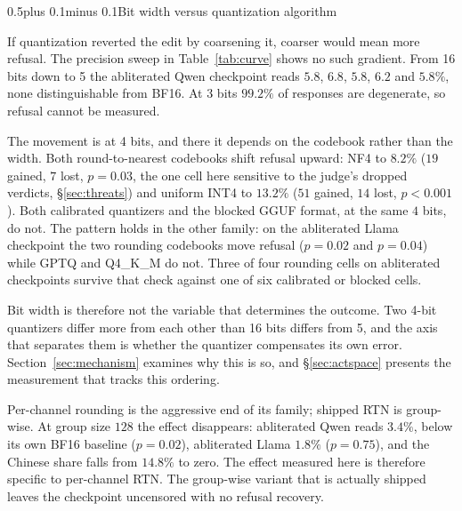 \documentclass[conference,compsoc,letterpaper]{IEEEtran}
\makeatletter
\def\subsection{\@startsection{subsection}{2}{\z@}{1\baselineskip plus 0.25\baselineskip minus 0.25\baselineskip}%
{0.5\baselineskip plus 0.1\baselineskip minus 0.1\baselineskip}{\normalfont\sublargesize\bfseries}}%
\makeatother
\begin{document}
\subsection{Bit width versus quantization algorithm} \label{sec:bits}

\begin{table}[t]
\caption{Abliterated Qwen2.5-7B across round-to-nearest precisions and NF4,
$n=500$, LLM judge. $p$ is an exact McNemar test against BF16.}
\label{tab:curve}
\centering\scriptsize

\end{table}

If quantization reverted the edit by coarsening it, coarser would mean more refusal. The precision sweep in Table~\ref{tab:curve} shows no such gradient. From 16 bits down to 5 the abliterated Qwen checkpoint reads $5.8$, $6.8$, $5.8$, $6.2$ and $5.8\%$, none distinguishable from BF16. At 3 bits $99.2\%$ of responses are degenerate, so refusal cannot be measured.

The movement is at 4 bits, and there it depends on the codebook rather than the width. Both round-to-nearest codebooks shift refusal upward: NF4 to $8.2\%$ ($19$ gained, $7$ lost, $p=0.03$, the one cell here sensitive to the judge's dropped verdicts, \S\ref{sec:threats}) and uniform INT4 to $13.2\%$ ($51$ gained, $14$ lost, $p<0.001$). Both calibrated quantizers and the blocked GGUF format, at the same $4$ bits, do not. The pattern holds in the other family: on the abliterated Llama checkpoint the two rounding codebooks move refusal ($p=0.02$ and $p=0.04$) while GPTQ and Q4\_K\_M do not. Three of four rounding cells on abliterated checkpoints survive that check against one of six calibrated or blocked cells.

Bit width is therefore not the variable that determines the outcome. Two 4-bit quantizers differ more from each other than 16 bits differs from 5, and the axis that separates them is whether the quantizer compensates its own error. Section~\ref{sec:mechanism} examines why this is so, and \S\ref{sec:actspace} presents the measurement that tracks this ordering.

Per-channel rounding is the aggressive end of its family; shipped RTN is group-wise. At group size $128$ the effect disappears: abliterated Qwen reads $3.4\%$, below its own BF16 baseline ($p=0.02$), abliterated Llama $1.8\%$ ($p=0.75$), and the Chinese share falls from $14.8\%$ to zero. The effect measured here is therefore specific to per-channel RTN. The group-wise variant that is actually shipped leaves the checkpoint uncensored with no refusal recovery.
\end{document}
